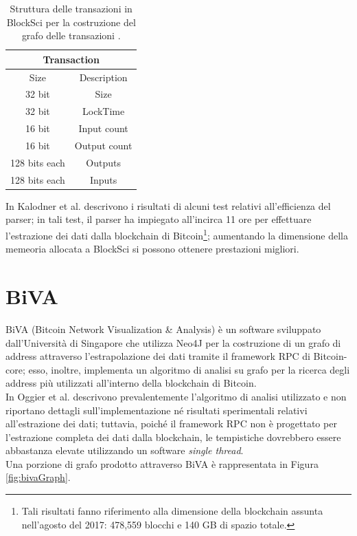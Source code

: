 \begin{table}
       \centering\small
           \begin{tabular}{|c|c|}
               \hline
                 \multicolumn{2}{|c|}{\textbf{Transaction}} \\
                 \hline
                 \multicolumn{1}{|c|}{Size} & \multicolumn{1}{c|}{Description} \\
               \hline \hline
               32 bit & Size   \\
               \hline
               32 bit & LockTime \\
               \hline
               16 bit & Input count \\
               \hline
               16 bit & Output count \\
               \hline
               128 bits each & ﻿Outputs \\
               \hline
               128 bits each & ﻿Inputs \\
               \hline
       \end{tabular}
       \caption{Struttura delle transazioni in BlockSci per la costruzione del grafo delle transazioni \cite{DBLP:journals/corr/abs-1709-02489}.\label{tab:blockSciSerialization}}
   \end{table}

In  \cite{DBLP:journals/corr/abs-1709-02489} Kalodner et al. descrivono i risultati di alcuni test relativi all'efficienza del parser; in tali test, il parser ha impiegato all'incirca 11 ore per effettuare l'estrazione dei dati dalla blockchain di Bitcoin\footnote{Tali risultati fanno riferimento alla dimensione della blockchain assunta nell'agosto del 2017: 478,559 blocchi e 140 GB di spazio totale.}; aumentando la dimensione della memeoria allocata a BlockSci si possono ottenere prestazioni migliori.

\section{BiVA} \label{sec:biva}

BiVA (Bitcoin Network Visualization \& Analysis) è un software sviluppato dall'Università di Singapore che utilizza Neo4J \cite{neo4j} per la costruzione di un grafo di address attraverso l'estrapolazione dei dati tramite il framework RPC di Bitcoin-core; esso, inoltre, implementa un algoritmo di analisi su grafo per la ricerca degli address più utilizzati all'interno della blockchain di Bitcoin.\\
In \cite{DBLP:conf/icdm/OggierPD18} Oggier et al. descrivono prevalentemente l'algoritmo di analisi utilizzato e non riportano dettagli sull'implementazione né risultati sperimentali relativi all'estrazione dei dati; tuttavia, poiché il framework RPC non è progettato  per l'estrazione completa dei dati dalla blockchain, le tempistiche dovrebbero essere abbastanza elevate utilizzando un software \emph{single thread}.\\
Una porzione di grafo prodotto attraverso BiVA è rappresentata in Figura \ref{fig:bivaGraph}.

